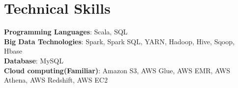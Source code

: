 \documentclass[letterpaper,11pt]{article}
\begin{document}
\section{Technical Skills}
 \begin{itemize}[leftmargin=0.15in, label={}]
    \small{\item{
     \textbf{Programming Languages}{:\hspace{.6cm}  Scala, SQL} \\
     \textbf{Big Data Technologies}{:\hspace{1cm}  Spark, Spark SQL, YARN, Hadoop, Hive, Sqoop, Hbase } \\
     \textbf{Database}{:\hspace{3.3cm} MySQL} \\
     \textbf{Cloud computing(Familiar)}{:\hspace{.1cm} Amazon S3, AWS Glue, AWS EMR, AWS Athena, AWS Redshift, AWS EC2 } \\
     
     
    }}
 \end{itemize}

\end{document}
